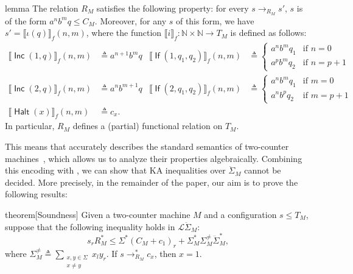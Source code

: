 \documentclass[11pt,a4paper]{amsart}
\theoremstyle{definition}
\DeclareMathOperator{\Inc}{\mathsf{Inc}}
\DeclareMathOperator{\If}{\mathsf{If}}
\DeclareMathOperator{\Halt}{\mathsf{Halt}}
\begin{document}
\begin{theoremEnd}{lemma}
  The relation $R_M$ satisfies the following property: for every
  $s \to _{R_M} s'$, $s$ is of the form $a^nb^mq \leq C_M$.  Moreover, for any
  $s$ of this form, we have $s' = \llbracket \iota (q) \rrbracket_f (n,m)$, where the
  function $ \llbracket i \rrbracket_f : \mathbb{N} \times \mathbb{N} \to T_M$ is
  defined as follows:
  \begin{align*}
     \llbracket \Inc(1,q) \rrbracket_f (n, m) &  \triangleq  a^{n+1}b^mq &
     \llbracket \If(1,q_{1},q_{2}) \rrbracket_f (n, m) &  \triangleq  \begin{cases}
      a^nb^mq_{1} & \text{if $n = 0$} \\
      a^pb^mq_{2} & \text{if $n = p+1$}
    \end{cases} \\
     \llbracket \Inc(2,q) \rrbracket_f (n, m) &  \triangleq  a^nb^{m+1}q &
     \llbracket \If(2,q_{1},q_{2}) \rrbracket_f (n, m) &  \triangleq  \begin{cases}
      a^nb^mq_{1} & \text{if $m = 0$} \\
      a^nb^pq_{2} & \text{if $m = p+1$}
    \end{cases} \\
     \llbracket \Halt(x) \rrbracket_f (n,m) &  \triangleq  c_x.
  \end{align*}
  In particular, $R_M$ defines a (partial) functional relation on $T_M$.
\end{theoremEnd}

This means that  accurately describes the
standard semantics of two-counter machines~\cite{Hopcroft2001}, which allows us
to analyze their properties algebraically.  Combining this encoding with
, we can show that KA inequalities over
\(\ddot{ \Sigma }_M\) cannot be decided.  More precisely, in the remainder of
the paper, our aim is to prove the following results:

\begin{theoremEnd}{theorem}[Soundness]
  \label{thm:soundness}
  Given a two-counter machine $M$ and a configuration $s  \leq  T_M$, suppose that
  the following inequality holds in $\mathcal{L}\ddot{ \Sigma }_M$:
  \[ s_rR_M^*  \leq   \Sigma ^*(C_M + c_1)_r +  \Sigma _M^* \Sigma _M^{ \neq }\ddot{ \Sigma }_M^*, \] where
  \(
     \Sigma ^{ \neq }_M  \triangleq   \sum _{\substack{x, y  \in   \Sigma  \\ x  \neq  y}} x_ly_r.
  \)
  If $s  \to _{R_M}^* c_x$, then $x = 1$.
\end{theoremEnd}
\end{document}
